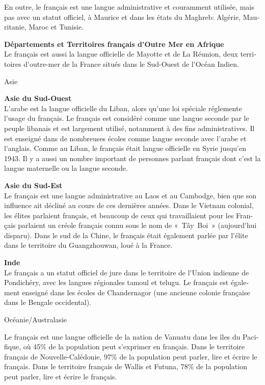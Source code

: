 \begin{french}
\begin{multicols}{2}
En outre, le français est une langue administrative et couramment
utilisée, mais pas avec un statut officiel, à Maurice et dans les
états du Maghreb: Algérie, Mauritanie, Maroc et Tunisie.

{\bf Départements et Territoires français d{\mbox '}Outre Mer en Afrique}\\
Le français est aussi la langue officielle de Mayotte et de La
Réunion, deux territoires d{\mbox '}outre-mer de la France situés dans
le Sud-Ouest de l{\mbox '}Océan Indien.

\begin{center}
{\sc Asie}
\end{center}

{\bf Asie du Sud-Ouest}\\ 
L{\mbox '}arabe est la langue officielle du Liban, alors qu{\mbox '}une 
loi spéciale réglemente l{\mbox '}usage du français. Le
français est considéré comme une langue seconde par le peuple libanais
et est largement utilisé, notamment à des fins administratives. Il est
enseigné dans de nombreuses écoles comme langue seconde avec l{\mbox
 '}arabe et l{\mbox '}anglais. Comme au Liban, le français était
langue officielle en Syrie jusqu{\mbox '}en 1943. Il y a aussi un
nombre important de personnes parlant français dont c{\mbox '}est la
langue maternelle ou la langue seconde.

{\bf Asie du Sud-Est}\\ 
Le français est une langue administrative au
Laos et au Cambodge, bien que son influence ait décliné au cours de
ces dernières années. Dans le Vietnam colonial, les élites parlaient
français, et beaucoup de ceux qui travaillaient pour les Français
parlaient un créole français connu sous le nom de «~Tây~Boi~»
(aujourd{\mbox '}hui disparu).  Dans le sud de la Chine, le français
était également parlée par l{\mbox '}élite dans le territoire du
Guangzhouwan, loué à la France.

{\bf Inde}\\
Le français a un statut officiel de jure dans le territoire de l{\mbox
 '}Union indienne de Pondichéry, avec les langues régionales tamoul
et telugu. Le français est également enseigné dans les écoles de
Chandernagor (une ancienne colonie française dans le Bengale
occidental).

\begin{center}
{\sc Océanie/Australasie}
\end{center}
Le français est une langue officielle de la nation de Vanuatu dans les
îles du Pacifique, où 45\% de la population peut s{\mbox '}exprimer en
français. Dans le territoire français de Nouvelle-Calédonie, 97\% de
la population peut parler, lire et écrire le français. Dans le
territoire français de Wallis et Futuna, 78\% de la population peut
parler, lire et écrire le français.


\end{multicols}
\end{french}
